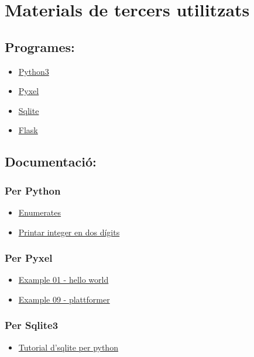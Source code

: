 
\section{Materials de tercers utilitzats}

\subsection{Programes:}
\begin{itemize}
\item{ \href{https://python.org/}{Python3} }
\item{ \href{https://github.com/kitao/pyxel}{Pyxel} }
\item{ \href{https://sqlite.org/}{Sqlite} }
\item{ \href{https://github.com/pallets/flask}{Flask} }

\end{itemize}


\subsection{Documentaci\'o:}

\subsubsection*{Per Python}
\begin{itemize}
\item{ \href{https://docs.python.org/3/library/enum.html}
{Enumerates}}
\item{ \href{https://stackoverflow.com/questions/64094654/python-converting-letter-to-two-digit-number}
{Printar integer en dos d\'igits}}
\end{itemize}


\subsubsection*{Per Pyxel}

\begin{itemize}
\item{\href{https://raw.githubusercontent.com/kitao/pyxel/main/python/pyxel/examples/01_hello_pyxel.py}
{Example 01 - hello world}}
\item{\href{https://raw.githubusercontent.com/kitao/pyxel/main/python/pyxel/examples/10_platformer.py}
{Example 09 - plattformer}}
\end{itemize}

\subsubsection*{Per Sqlite3}
\begin{itemize}
\item{\href{https://pynative.com/python-sqlite/}
{Tutorial d'sqlite per python}}
\end{itemize}



